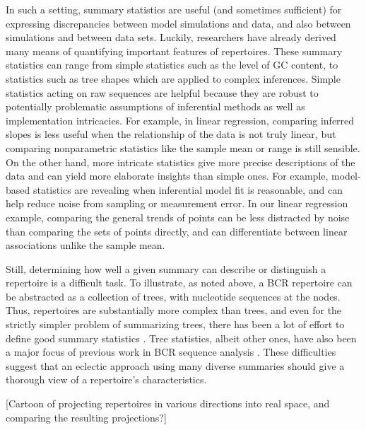 \documentclass{article}
\begin{document}
In such a setting, summary statistics are useful (and sometimes sufficient) for expressing discrepancies between model simulations and data, and also between simulations and between data sets.
Luckily, researchers have already derived many means of quantifying important features of repertoires.
These summary statistics can range from simple statistics such as the level of GC content, to statistics such as tree shapes which are applied to complex inferences.
Simple statistics acting on raw sequences are helpful because they are robust to potentially problematic assumptions of inferential methods as well as implementation intricacies.
For example, in linear regression, comparing inferred slopes is less useful when the relationship of the data is not truly linear, but comparing nonparametric statistics like the sample mean or range is still sensible.
On the other hand, more intricate statistics give more precise descriptions of the data and can yield more elaborate insights than simple ones.
For example, model-based statistics are revealing when inferential model fit is reasonable, and can help reduce noise from sampling or measurement error.
In our linear regression example, comparing the general trends of points can be less distracted by noise than comparing the sets of points directly, and can differentiate between linear associations unlike the sample mean.

Still, determining how well a given summary can describe or distinguish a repertoire is a difficult task.
To illustrate, as noted above, a BCR repertoire can be abstracted as a collection of trees, with nucleotide sequences at the nodes.
Thus, repertoires are substantially more complex than trees, and even for the strictly simpler problem of summarizing trees, there has been a lot of effort to define good summary statistics \cite{Mooers1997-jl}.
Tree statistics, albeit other ones, have also been a major focus of previous work in BCR sequence analysis \cite{Dunn-Walters2004-hv,Mehr2004-ej,Steiman-Shimony2006-fm,Shahaf2008-cc}.
These difficulties suggest that an eclectic approach using many diverse summaries should give a thorough view of a repertoire's characteristics.

[Cartoon of projecting repertoires in various directions into real space, and comparing the resulting projections?]
\end{document}
